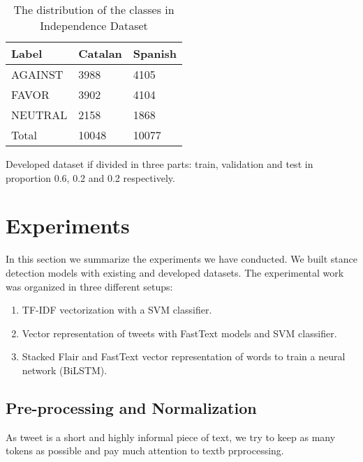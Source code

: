 \documentclass[10pt, a4paper]{article}
\begin{document}
\begin{table}[!h]
\begin{center}
\begin{tabularx}{\columnwidth}{|l|l|X|}

      \hline
        Label&Catalan&Spanish\\
      \hline
        AGAINST & 3988&4105\\
      \hline
        FAVOR & 3902&4104\\
      \hline
        NEUTRAL & 2158&1868\\
      \hline
        Total & 10048&10077\\
      \hline

\end{tabularx}
\caption{The distribution of the classes in Independence Dataset}
 \end{center}
 \label{tab:distr_dataset}
\end{table}




Developed dataset if divided in three parts: train, validation and  test in proportion 0.6, 0.2 and 0.2 respectively. 

\section{Experiments}

In this section we summarize the experiments we have conducted. We built stance detection models with existing and developed datasets. The experimental work was organized in three different setups: 

\begin{enumerate} 
\item TF-IDF vectorization with a SVM classifier. 
\item Vector representation of tweets with FastText models and SVM classifier.
\item Stacked Flair and FastText vector representation of words to train a neural network (BiLSTM). 
\end{enumerate}


\subsection{Pre-processing and Normalization}

As  tweet is a short and highly informal piece of text, we try to keep as many tokens as possible and pay much attention to textb prprocessing.  
\end{document}

